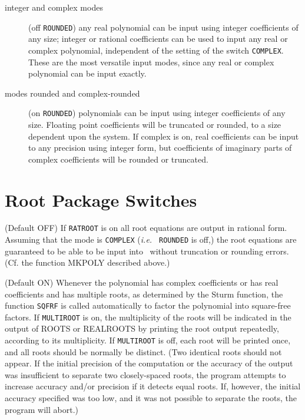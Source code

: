 \begin{description}
\item[integer and complex modes] (off {\tt ROUNDED}) any real
polynomial can be input using integer coefficients of any size; integer or
rational coefficients can be used to input any real or complex polynomial,
independent of the setting of the switch {\tt COMPLEX}.  These are the most
versatile input modes, since any real or complex polynomial can be input
exactly.

\item[modes rounded and complex-rounded] (on {\tt ROUNDED}) polynomials can be
input using
integer coefficients of any size.  Floating point coefficients will be
truncated or rounded, to a size dependent upon the system.  If complex
is on, real coefficients can be input to any precision using integer
form, but coefficients of imaginary parts of complex coefficients will
be rounded or truncated.
\end{description}

\section{Root Package Switches}

\begin{description}
\item[RATROOT] (Default OFF) If {\tt RATROOT} is on all root equations are
output in rational form.  Assuming that the mode is {\tt COMPLEX}
({\em i.e.\ }
{\tt ROUNDED} is off,) the root equations are
guaranteed to be able to be input into \REDUCE\ without truncation or
rounding errors. (Cf. the function MKPOLY described above.)

\item[MULTIROOT] (Default ON) Whenever the polynomial has complex
coefficients or has real coefficients and has multiple roots, as
 determined by the Sturm function, the function {\tt SQFRF}
is called automatically to factor the polynomial into square-free factors.
If {\tt MULTIROOT} is on, the multiplicity of the roots will be indicated
in the output of ROOTS or REALROOTS by printing the root output
repeatedly, according to its multiplicity.  If {\tt MULTIROOT} is off,
each root will be printed once, and all roots should be normally be
distinct. (Two identical roots should not appear.  If the initial
precision of the computation or the accuracy of the output was
insufficient to separate two closely-spaced roots, the program attempts to
increase accuracy and/or precision if it detects equal roots.  If,
however, the initial accuracy specified was too low, and it was not
possible to separate the roots, the program will abort.)

\end{description}


